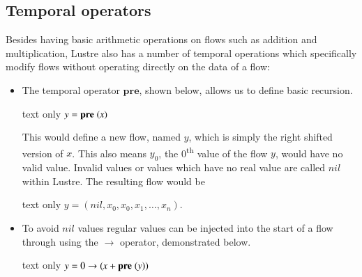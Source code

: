 \subsection{Temporal operators}
Besides having basic arithmetic operations on flows such as addition and multiplication, Lustre also has a number of temporal operations which specifically modify flows without operating directly on the data of a flow:
\begin{itemize}
\item
    The temporal operator \ensuremath{\textbf{pre}}, shown below, allows us to define basic recursion. \\

    \begin{changemargin}{1cm}{0cm}
    \begin{expansionno}{text only}
    \ensuremath{\Varid{y}\mathrel{=}\textbf{pre}\;(\Varid{x})}
    \end{expansionno} 
    \end{changemargin}%

    This would define a new flow, named $y$, which is simply the right shifted version of $x$. 
    This also means $y_0$, the 0\textsuperscript{th} value of the flow $y$, would have no valid value. 
    Invalid values or values which have no real value are called $nil$ within Lustre.
    The resulting flow would be \\

    \begin{changemargin}{1cm}{0cm}
    \begin{expansionno}{text only}
    $y = (nil,x_0,x_0,x_1,\ldots,x_n)$.
    \end{expansionno}
    \end{changemargin}%

\item
    To avoid $nil$ values regular values can be injected into the start of a flow through using the \ensuremath{\to } operator, demonstrated below.\\

    \begin{changemargin}{1cm}{0cm}
    \begin{expansionno}{text only}
    \ensuremath{\Varid{y}\mathrel{=}\mathrm{0}\to (\Varid{x}\mathbin{+}\textbf{pre}\;(\Varid{y}))}
    \end{expansionno}
    \end{changemargin}%


\end{itemize}
